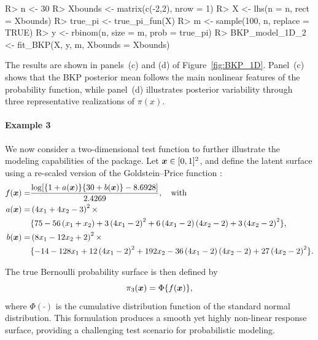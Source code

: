 \documentclass[article, shortnames]{jss}
\renewcommand{\vec}[1]{\mbox{\boldmath ${#1}$}}
\begin{document}
\begin{CodeChunk}
\begin{CodeInput} 
R> n <- 30
R> Xbounds <- matrix(c(-2,2), nrow = 1)
R> X <- lhs(n = n, rect = Xbounds)
R> true_pi <- true_pi_fun(X)
R> m <- sample(100, n, replace = TRUE)
R> y <- rbinom(n, size = m, prob = true_pi) 
R> BKP_model_1D_2 <- fit_BKP(X, y, m, Xbounds = Xbounds)
\end{CodeInput}
\end{CodeChunk}

The results are shown in panels~(c) and (d) of Figure~\ref{fig:BKP_1D}. Panel~(c) shows that the BKP posterior mean follows the main nonlinear features of the probability function, while panel~(d) illustrates posterior variability through three representative realizations of $\pi(x)$.

\paragraph{Example 3} We now consider a two-dimensional test function to further illustrate the modeling capabilities of the  package. Let $\vec{x} \in [0,1]^2$, and define the latent surface using a re-scaled version of the Goldstein–Price function \citep{Picheny2013Benchmark}:
\begin{align*}
	f(\vec{x})=& \frac{\log[\{1+a(\vec{x})\}\{30+b(\vec{x})\}-8.6928]}{2.4269}, \quad \text{with}\\
	a(\vec{x}) =& \left(4 x_1 + 4 x_2 - 3 \right)^2  \times  \notag  \\
	& \{75 - 56 \left(x_1 + x_2 \right) + 3\left(4 x_1 - 2 \right)^2 + 6\left(4 x_1 - 2 \right)\left(4 x_2 - 2 \right) + 3\left(4 x_2 - 2 \right)^2\}, \notag \\
	b(\vec{x}) =& \left(8 x_1 - 12 x_2 +2 \right)^2 \times \notag \\
	& \{-14 - 128 x_1 + 12\left(4 x_1 - 2 \right)^2 + 192 x_2 - 36\left(4 x_1 - 2 \right)\left(4 x_2 - 2 \right) + 27\left(4 x_2 - 2 \right)^2 \}.\notag 
\end{align*} 

The true Bernoulli probability surface is then defined by 
\begin{equation}\label{eq:Goldstein-Price}
	\pi_3(\vec{x}) = \Phi\{f(\vec{x})\}, 
\end{equation}
where $\Phi(\cdot)$ is the cumulative distribution function of the standard normal distribution. This formulation produces a smooth yet highly non-linear response surface, providing a challenging test scenario for probabilistic modeling.
\end{document}
